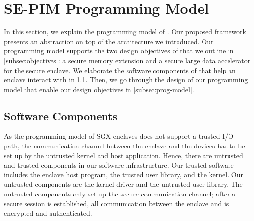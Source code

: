 

\section{SE-PIM Programming Model}
\label{sec:prog-model}

In this section, we explain the programming model of \thename. Our proposed framework presents an abstraction on top of the \thename architecture we introduced. Our programming model supports the two design objectives of \thename that we outline in \cref{subsec:objectives}: a secure memory extension and a secure large data accelerator for the secure enclave. We elaborate the software components of \thename that help an enclave interact with \thename in \cref{subsec:software}. Then, we go through the design of our programming model that enable our design objectives in \cref{subsec:prog-model}.




\subsection{Software Components}
\label{subsec:software}
As the programming model of SGX enclaves does not support a trusted I/O path, the communication channel between the enclave and the devices has to be set up by the untrusted kernel and host application. Hence, there are untrusted and trusted components in our software infrastructure. Our trusted software includes the enclave host program, the trusted \thename user library, and the \thename kernel. Our untrusted components are the kernel driver and the untrusted user library. The untrusted components only set up the secure communication channel; after a secure session is established, all communication between the enclave and \thename is encrypted and authenticated.

